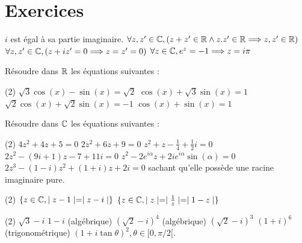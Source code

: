 \section{Exercices}



\begin{exercise}[subtitle= Assertions justes ou fausses ?, difficulty=*]
		\begin{tasks} 
			\task $i$ est égal à sa partie imaginaire. 
			\task $\forall z,z' \in \mathbb{C}, ( z+z' \in \mathbb{R} \wedge z.z' \in \mathbb{R} \Longrightarrow z,z' \in \mathbb{R})$
			\task $\forall z,z' \in \mathbb{C}, (z+iz' = 0 \Longrightarrow z = z' = 0)$
			\task $\forall z \in \mathbb{C}, e^z = -1 \Longrightarrow z = i\pi$
		\end{tasks}
\end{exercise}


\begin{exercise}[subtitle= Résolution d'équations dans $\RR$, difficulty=*]
	Résoudre dans $\RR$ les équations suivantes : 
	\begin{tasks}(2) 
		\task $\sqrt{3} \cos(x) - \sin(x) = \sqrt{2}$
	    \task $\cos(x) + \sqrt{3}\sin(x) = 1$
	    \task $\sqrt{2}\cos(x) + \sqrt{2}\sin(x) = -1$
	    \task $\cos(x) + \sin(x) = 1$
	\end{tasks}
\end{exercise}

\begin{exercise}[subtitle= Résolution d'équations dans $\CC$, difficulty=***]
	Résoudre dans $\CC$ les équations suivantes : 
	\begin{tasks}(2) 
		\task $4z^2 + 4z + 5 = 0$
		\task $2z^2 + 6z + 9= 0$
		\task $z^2 + z - \frac{1}{4} +\frac{1}{2}i = 0$
		\task $2z^2-(9i+1)z-7+11i=0$
		\task $z^2 - 2 e^{i\alpha} z + 2ie^{i\alpha}\sin(\alpha) = 0$
		\task $2z^3 -(1-i)z^2 + (1+i)z+2i=0$ sachant qu'elle possède une racine imaginaire pure. 
	\end{tasks}
\end{exercise}


\begin{exercise}[subtitle= Déterminer les ensembles, difficulty=**]
	\begin{tasks}(2) 
		\task $\{z \in \mathbb{C}, \mid z-1 \mid = \mid z - i\mid\}$
		\task $\{z \in \mathbb{C}, \mid z \mid = \mid \frac{1}{z}\mid = \mid 1 -z \mid\}$
	\end{tasks}
\end{exercise}


\begin{exercise}[subtitle=Transformer le nombre complexe sous une autre forme, difficulty=*]
	\begin{tasks}(2)
		\task $\sqrt{3} - i$ 
		\task $1 - i$
		\task (algébrique) $(\sqrt{2} - i)^4$
		\task (algébrique) $(\sqrt{2} - i)^3$
		\task $(1+i)^6$
		\task (trigonométrique)	$ (1 + i\tan{\theta})^2, \theta \in [0, \pi/2 [ $.  
	\end{tasks}
\end{exercise}



